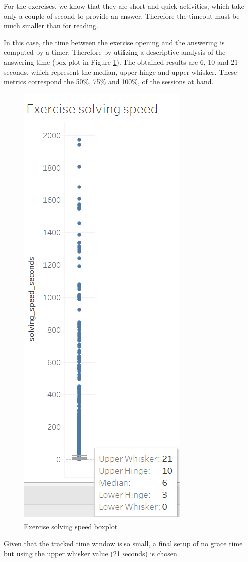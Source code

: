 For the exercises, we know that they are short and quick activities, which take only a couple of second to provide an answer. Therefore the timeout must be much smaller than for reading.

In this case, the time between the exercise opening and the answering is computed by a timer. Therefore by utilizing a descriptive analysis of the answering time (box plot in Figure \ref{fig:exercise_solving_speed}). The obtained results are 6, 10 and 21 seconds, which represent the median, upper hinge and upper whisker. These metrics correspond the 50\%, 75\% and 100\%, of the sessions at hand. 

\begin{figure}[bth]
	\centering
	\includegraphics[width=0.2\linewidth]{gfx/exercise_solving_speed}
	\caption{Exercise solving speed boxplot}\label{fig:exercise_solving_speed}
\end{figure}

Given that the tracked time window is so small, a final setup of no grace time but using the upper whisker value (21 seconds) is chosen.


